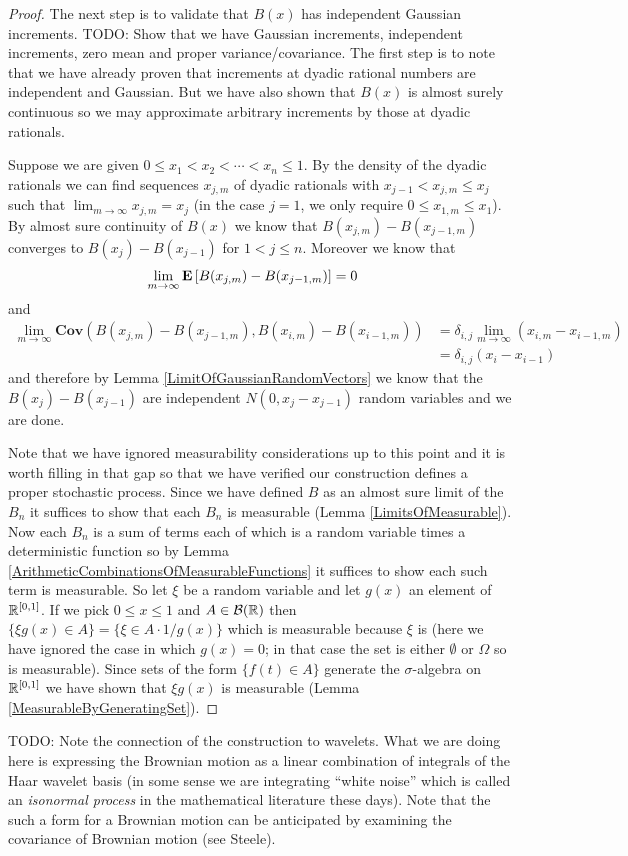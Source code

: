 \begin{proof}
The next step is to validate that $B(x)$ has independent Gaussian increments.
TODO: Show that we have Gaussian increments, independent increments,
zero mean and proper variance/covariance.  The first step is to note
that we have already proven that increments at dyadic rational numbers
are independent and Gaussian.  But we have also shown that $B(x)$ is
almost surely continuous so we may approximate arbitrary increments by
those at dyadic rationals.

Suppose we are given $0 \leq x_1 < x_2 < \cdots < x_n \leq 1$.  By the
density of the dyadic rationals we can find sequences $x_{j,m}$ of
dyadic rationals with $x_{j-1} < x_{j,m} \leq x_j$ such that $\lim_{m
  \to \infty} x_{j,m}= x_j$ (in the case $j=1$, we only require $0
\leq x_{1,m} \leq x_1$).  By almost sure continuity of $B(x)$ we know
that $B(x_{j,m}) - B(x_{j-1,m})$ converges to $B(x_j) - B(x_{j-1})$
for $1 < j \leq n$.  Moreover we know that 
\begin{align*}
\lim_{m \to \infty} \textbf{E}\left[B(x_{j,m}) - B(x_{j-1,m})\right] &= 0
\end{align*}
and 
\begin{align*}
\lim_{m \to \infty} \textbf{Cov}\left ( B(x_{j,m}) - B(x_{j-1,m}), B(x_{i,m})
  - B(x_{i-1,m}) \right) &= \delta_{i,j} \lim_{m \to \infty} (x_{i,m} -
x_{i-1,m}) \\
&= \delta_{i,j}  (x_i - x_{i-1})
\end{align*}
and therefore by Lemma \ref{LimitOfGaussianRandomVectors} we know that
the $B(x_j) - B(x_{j-1})$ are independent $N(0, x_j - x_{j-1})$ random
variables and we are done.

Note that we have ignored measurability considerations up to this
point and it is worth filling in that gap so that we have verified our
construction defines a proper stochastic process.  Since we have
defined $B$ as an almost sure limit of the $B_n$ it suffices to show
that each $B_n$ is measurable  (Lemma
\ref{LimitsOfMeasurable}).  Now each $B_n$ is a sum of terms each of
which is a random variable times a deterministic function so by Lemma
\ref{ArithmeticCombinationsOfMeasurableFunctions} it suffices to show
each such term is measurable.  So let $\xi$ be a random variable and
let $g(x)$ an element of $\mathbb{R}^{[0,1]}$.  If we pick $0 \leq x \leq
1$ and $A \in \mathcal{B}(\mathbb{R})$ then $\lbrace \xi g(x) \in A
\rbrace = \lbrace \xi \in A\cdot  1/g(x) \rbrace$ which is measurable
because $\xi$ is (here we have ignored the case in which $g(x) = 0$;
in that case the set is either $\emptyset$ or $\Omega$ so is
measurable).  Since sets of the form $\lbrace f (t) \in A \rbrace$
generate the $\sigma$-algebra on $\mathbb{R}^{[0,1]}$ we have shown that
$\xi g(x)$ is measurable (Lemma \ref{MeasurableByGeneratingSet}).
\end{proof}
TODO: Note the connection of the construction to wavelets.  What we
are doing here is expressing the Brownian motion as a linear
combination of integrals of the Haar wavelet basis (in some sense we
are integrating ``white noise'' which is called an \emph{isonormal
  process} in the mathematical literature these days).  Note that the
such a form for a Brownian motion can be anticipated by examining the
covariance of Brownian motion (see Steele).

